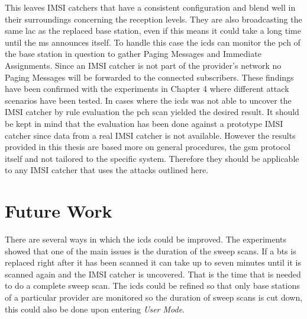 This leaves IMSI catchers that have a consistent configuration and blend well in their surroundings concerning the reception levels.
They are also broadcasting the same \gls{lac} as the replaced base station, even if this means it could take a long time until the \gls{ms} announces itself.
To handle this case the \gls{icds} can monitor the \gls{pch} of the base station in question to gather Paging Messages and Immediate Assignments.
Since an IMSI catcher is not part of the provider's network no Paging Messages will be forwarded to the connected subscribers.
These findings have been confirmed with the experiments in Chapter 4 where different attack scenarios have been tested.
In cases where the \gls{icds} was not able to uncover the IMSI catcher by rule evaluation the \gls{pch} scan yielded the desired result.
It should be kept in mind that the evaluation has been done against a prototype IMSI catcher since data from a real IMSI catcher is not available.
However the results provided in this thesis are based more on general procedures, the \gls{gsm} protocol itself and not tailored to the specific system.
Therefore they should be applicable to any IMSI catcher that uses the attacks outlined here.

\section{Future Work}
There are several ways in which the \gls{icds} could be improved.
The experiments showed that one of the main issues is the duration of the sweep scans.
If a \gls{bts} is replaced right after it has been scanned it can take up to seven minutes until it is scanned again and the IMSI catcher is uncovered.
That is the time that is needed to do a complete sweep scan.
The \gls{icds} could be refined so that only base stations of a particular provider are monitored so the duration of sweep scans is cut down, this could also be done upon entering \emph{User Mode}.


